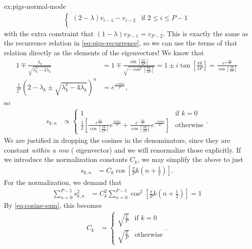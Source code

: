 \begin{DefAnswer}{ex:pigs-normal-mode}
\begin{align}
\begin{cases}
				(2 - \lambda) v_{i-1} - v_{i-2} & \text{if } 2 \le i \le P - 1 \\
			\end{cases}
	\end{align}
	with the extra constraint that $(1 - \lambda) v_{P-1} = v_{P-2}$.
	This is exactly the same as the recurrence relation in \cref{eq:pigs-recurrence}, so we can use the terms of that relation directly as the elements of the eigenvectors!
	We know that
	\begin{subequations}
	\begin{align}
		1 \mp \frac{\lambda_k}{\sqrt{\lambda_k^2 - 4 \lambda_k}}
		&= 1 \mp \frac{\sin{\left[ \frac{\pi k}{2 P} \right]}}{\sqrt{-\cos^2{\left[ \frac{\pi k}{2 P} \right]}}}
		= 1 \pm i \tan{\left[ \frac{\pi k}{2 P} \right]}
		= \frac{e^{\pm \frac{\pi i k}{2 P}}}{\cos{\left[ \frac{\pi k}{2 P} \right]}} \\
		\frac{1}{2^n} \left( 2 - \lambda_k \pm \sqrt{\lambda_k^2 - 4 \lambda_k} \right)^n
		&= e^{\frac{\pm \pi i k n}{P}},
	\end{align}
	\end{subequations}
	so
	\begin{align}
		s_{k,n}
		&\propto \begin{cases}
				1 & \text{if } k = 0 \\
				\frac{1}{2} \left[
					\frac{e^{\frac{\pi i k}{2 P}}}{\cos{\left[ \frac{\pi k}{2 P} \right]}} e^{\frac{\pi i k n}{P}}
						+ \frac{e^{-\frac{\pi i k}{2 P}}}{\cos{\left[ \frac{\pi k}{2 P} \right]}} e^{\frac{-\pi i k n}{P}}
				\right] & \text{otherwise}
			\end{cases}.
	\end{align}
	We are justified in dropping the cosines in the denominators, since they are constant \emph{within a row} (\ie{} eigenvector) and we will renormalize those explicitly.
	If we introduce the normalization constants $C_k$, we may simplify the above to just
	\begin{align}
		s_{k,n}
		&= C_k \cos{\left[ \frac{\pi}{P} k \left( n + \frac{1}{2} \right) \right]}.
			\label{eq:pigs-nm-transform}
	\end{align}
	For the normalization, we demand that
	\begin{align}
		\sum_{n=0}^{P-1} s_{k,n}^2
		&= C_k^2 \sum_{n=0}^{P-1} \cos^2{\left[ \frac{\pi}{P} k \left( n + \frac{1}{2} \right) \right]}
		= 1
	\end{align}
	By \vref{eq:cosine-sum}, this becomes
	\begin{align}
		C_k
		&= \begin{cases}
				\sqrt{\frac{1}{P}} & \text{if } k = 0 \\
				\sqrt{\frac{2}{P}} & \text{otherwise}
			\end{cases}.
	\end{align}


\end{DefAnswer}
